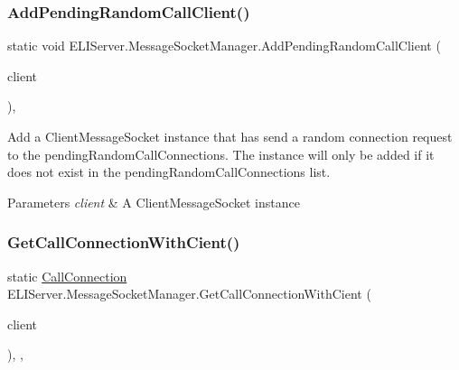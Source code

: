 \subsubsection{\texorpdfstring{Add\+Pending\+Random\+Call\+Client()}{AddPendingRandomCallClient()}}
{\footnotesize\ttfamily static void E\+L\+I\+Server.\+Message\+Socket\+Manager.\+Add\+Pending\+Random\+Call\+Client (\begin{DoxyParamCaption}\item[{\hyperlink{class_e_l_i_server_1_1_messaging_1_1_client_message_socket}{Client\+Message\+Socket}}]{client }\end{DoxyParamCaption})\hspace{0.3cm}{\ttfamily [inline]}, {\ttfamily [static]}}



Add a Client\+Message\+Socket instance that has send a random connection request to the pending\+Random\+Call\+Connections. The instance will only be added if it does not exist in the pending\+Random\+Call\+Connections list. 


\begin{DoxyParams}{Parameters}
{\em client} & A Client\+Message\+Socket instance\\
\hline
\end{DoxyParams}
\mbox{\label{class_e_l_i_server_1_1_message_socket_manager_aa9a1bde31e6bb4d0ef01f974a5784d08}} 
\subsubsection{\texorpdfstring{Get\+Call\+Connection\+With\+Cient()}{GetCallConnectionWithCient()}}
{\footnotesize\ttfamily static \hyperlink{class_e_l_i_server_1_1_call_connection}{Call\+Connection} E\+L\+I\+Server.\+Message\+Socket\+Manager.\+Get\+Call\+Connection\+With\+Cient (\begin{DoxyParamCaption}\item[{\hyperlink{class_e_l_i_server_1_1_messaging_1_1_client_message_socket}{Client\+Message\+Socket}}]{client }\end{DoxyParamCaption})\hspace{0.3cm}{\ttfamily [inline]}, {\ttfamily [static]}, {\ttfamily [private]}}



